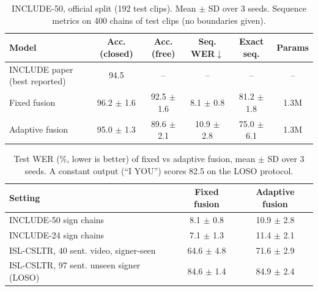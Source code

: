 \begin{table}[t]\centering\small
\caption{INCLUDE-50, official split (192 test clips). Mean $\pm$ SD over 3 seeds. Sequence metrics on 400 chains of test clips (no boundaries given).}
\label{tab:include50}
\begin{tabular}{lccccc}\toprule
Model & Acc. (closed) & Acc. (free) & Seq. WER$\downarrow$ & Exact seq. & Params\\\midrule
INCLUDE paper (best reported) & 94.5 & -- & -- & -- & --\\
Fixed fusion & 96.2 $\pm$ 1.6 & 92.5 $\pm$ 1.6 & 8.1 $\pm$ 0.8 & 81.2 $\pm$ 1.8 & 1.3M \\
Adaptive fusion & 95.0 $\pm$ 1.3 & 89.6 $\pm$ 2.1 & 10.9 $\pm$ 2.8 & 75.0 $\pm$ 6.1 & 1.3M \\
\bottomrule\end{tabular}\end{table}

\begin{table}[t]\centering\small
\caption{Test WER (\%, lower is better) of fixed vs adaptive fusion, mean $\pm$ SD over 3 seeds. A constant output (``I YOU'') scores 82.5 on the LOSO protocol.}
\label{tab:fusion}
\begin{tabular}{lcc}\toprule
Setting & Fixed fusion & Adaptive fusion\\\midrule
INCLUDE-50 sign chains & 8.1 $\pm$ 0.8 & 10.9 $\pm$ 2.8 \\
INCLUDE-24 sign chains & 7.1 $\pm$ 1.3 & 11.4 $\pm$ 2.1 \\
ISL-CSLTR, 40 sent. video, signer-seen & 64.6 $\pm$ 4.8 & 71.6 $\pm$ 2.9 \\
ISL-CSLTR, 97 sent. unseen signer (LOSO) & 84.6 $\pm$ 1.4 & 84.9 $\pm$ 2.4 \\
\bottomrule\end{tabular}\end{table}
